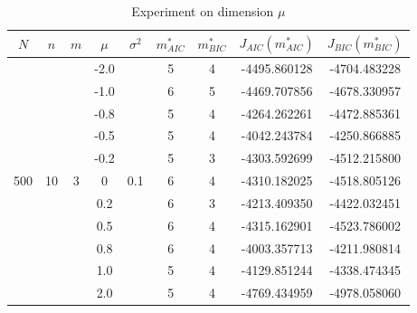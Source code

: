 \documentclass{article}
\begin{document}
\begin{table}[htbp]
	\centering
	\newcommand{\tabincell}[2]{\begin{tabular}{@{}#1@{}}#2\end{tabular}}
	\renewcommand\arraystretch{1.0}
	\caption{Experiment on dimension $\mu$}
	\label{mu}%
	\begin{tabular}{c|c|c|c|c|c|c|c|c}
    $N$ & $n$ & $m$ & $\mu$ & $\sigma^2$ & $m^*_{AIC}$ & $m^*_{BIC}$ & $J_{AIC}(m^*_{AIC})$ &$J_{BIC}(m^*_{BIC})$\\
    \hline
		\multirow{11}{*}{500} & \multirow{11}{*}{10} & \multirow{11}{*}{3} & -2.0 & \multirow{11}{*}{0.1} & 5 & 4 & -4495.860128 & -4704.483228\\
     & & & -1.0 & & 6 & 5 & -4469.707856 & -4678.330957\\
     & & & -0.8 & & 5 & 4 & -4264.262261 & -4472.885361\\
     & & & -0.5 & & 5 & 4 & -4042.243784 & -4250.866885\\
     & & & -0.2 & & 5 & 3 & -4303.592699 & -4512.215800\\
     & & & 0 & & 6 & 4 & -4310.182025 & -4518.805126\\
     & & & 0.2 & & 6 & 3 & -4213.409350 & -4422.032451\\
     & & & 0.5 & & 6 & 4 & -4315.162901 & -4523.786002\\
     & & & 0.8 & & 6 & 4 & -4003.357713 & -4211.980814\\
     & & & 1.0 & & 5 & 4 & -4129.851244 & -4338.474345\\
     & & & 2.0 & & 5 & 4 & -4769.434959 & -4978.058060\\
		\hline
\end{tabular}
\end{table}
\end{document}
